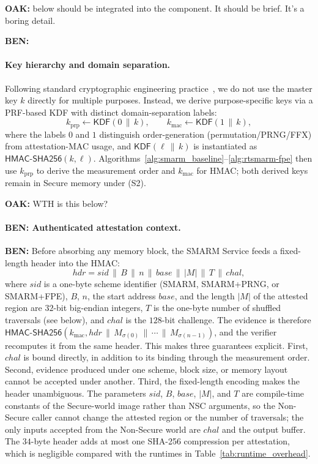 \documentclass{ieeeaccess}
\DeclareRobustCommand{\oak}[1]{{\color{OAKcolor}\textbf{OAK:} #1}}
\DeclareRobustCommand{\ben}[1]{{\color{BENcolor}\textbf{BEN:} #1}}
\newcommand{\rtsmarmone}{SMARM+PRNG\xspace}
\newcommand{\rtsmarmtwo}{SMARM+FPE\xspace}
\begin{document}
\oak{below should be integrated into the component. It should be brief. It's a boring detail.}
\ben{\paragraph{Key hierarchy and domain separation.}
Following standard cryptographic engineering practice~\cite{krawczyk2010hkdf,nist-sp800-108}, we do not use the master key $k$ directly for multiple purposes.
Instead, we derive purpose-specific keys via a PRF-based KDF with distinct domain-separation labels:
\[
  k_{\mathrm{prp}} \gets \mathsf{KDF}(0 \,\|\, k),
  \qquad
  k_{\mathrm{mac}} \gets \mathsf{KDF}(1 \,\|\, k),
\]
where the labels $0$ and $1$ distinguish order-generation (permutation/PRNG/FFX) from attestation-MAC usage, and $\mathsf{KDF}(\ell \,\|\, k)$ is instantiated as $\mathsf{HMAC\text{-}SHA256}(k,\ell)$.
Algorithms~\ref{alg:smarm_baseline}--\ref{alg:rtsmarm-fpe} then use $k_{\mathrm{prp}}$ to derive the measurement order and $k_{\mathrm{mac}}$ for HMAC; both derived keys remain in Secure memory under (S2).}

\oak{WTH is this below?}
\paragraph{\ben{Authenticated attestation context.}}
\ben{Before absorbing any memory block, the SMARM Service feeds a fixed-length header into the HMAC:
\[
  \mathit{hdr} = \mathit{sid} \,\|\, B \,\|\, n \,\|\, \mathit{base} \,\|\, |M| \,\|\, T \,\|\, chal,
\]
where $\mathit{sid}$ is a one-byte scheme identifier (SMARM, \rtsmarmone, or \rtsmarmtwo), $B$, $n$, the start address $\mathit{base}$, and the length $|M|$ of the attested region are $32$-bit big-endian integers, $T$ is the one-byte number of shuffled traversals (see below), and $chal$ is the $128$-bit challenge.
The evidence is therefore $\mathsf{HMAC\text{-}SHA256}(k_{\mathrm{mac}}, \mathit{hdr} \,\|\, M_{\sigma(0)} \,\|\, \cdots \,\|\, M_{\sigma(n-1)})$, and the verifier recomputes it from the same header.
This makes three guarantees explicit.
First, $chal$ is bound directly, in addition to its binding through the measurement order.
Second, evidence produced under one scheme, block size, or memory layout cannot be accepted under another.
Third, the fixed-length encoding makes the header unambiguous.
The parameters $\mathit{sid}$, $B$, $\mathit{base}$, $|M|$, and $T$ are compile-time constants of the Secure-world image rather than NSC arguments, so the Non-Secure caller cannot change the attested region or the number of traversals; the only inputs accepted from the Non-Secure world are $chal$ and the output buffer.
The $34$-byte header adds at most one SHA-256 compression per attestation, which is negligible compared with the runtimes in Table~\ref{tab:runtime_overhead}.}
\end{document}
